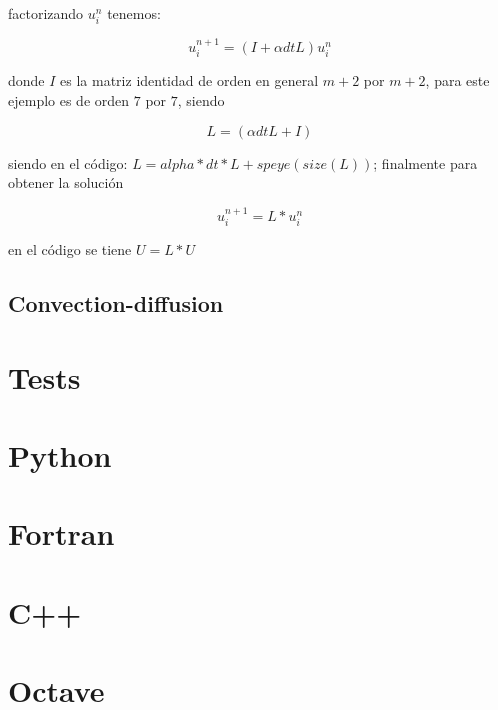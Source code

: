 \documentclass[a4paper,abstract=true]{scrreprt}
\begin{document}
factorizando $u^{n}_{i}$ tenemos:

 \begin{equation}	
	u^{n+1}_{i} = (I  +  \alpha dt L )u^{n}_{i}
\end{equation}

donde $I$ es la matriz identidad de orden en general $m+2$ por $m+2$, para este ejemplo es de orden $7$ por $7$, siendo 

$$  L = (\alpha dt L +I )$$

siendo en el código: $ L = alpha*dt*L + speye(size(L))$; finalmente  para obtener la solución 

 \begin{equation}	
	u^{n+1}_{i} = L *u^{n}_{i}
\end{equation}
 
 en el código se tiene $ U = L*U$






\section{Convection-diffusion}

\chapter{Tests}

\chapter{Python}

\chapter{Fortran}

\chapter{C++}

\chapter{Octave}

\nocite{*}
\printbibliography[title={Referencias}]
\end{document}
